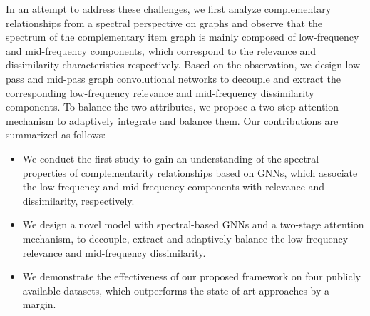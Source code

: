 \documentclass[letterpaper]{article} %
\newcommand{\suhang}[1]{\textcolor{blue}{SW: #1}}
\begin{document}
In an attempt to address these challenges, we first analyze complementary relationships from a spectral perspective on graphs and observe that the spectrum of the complementary item graph is mainly composed of low-frequency and mid-frequency components, which correspond to the relevance and dissimilarity characteristics respectively. Based on the observation, we design low-pass and mid-pass graph convolutional networks to decouple and extract the corresponding low-frequency relevance and mid-frequency dissimilarity components. To balance the two attributes, we propose a two-step attention mechanism to adaptively integrate and balance them. Our contributions are summarized as follows:
\begin{itemize}
    \item We conduct the first study to gain an understanding of the spectral properties of complementarity relationships based on GNNs, which associate the low-frequency and mid-frequency components with relevance and dissimilarity, respectively.
    \item We design a novel model with spectral-based GNNs and a two-stage attention mechanism, to decouple, extract and adaptively balance the low-frequency relevance and mid-frequency dissimilarity.
    \item We demonstrate the effectiveness of our proposed framework on four publicly available datasets, which outperforms the state-of-art approaches by a margin.
\end{itemize}

\end{document}
